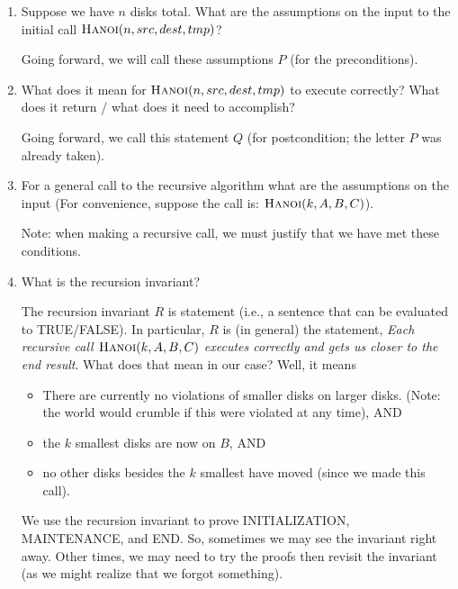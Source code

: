 \documentclass{article}
\begin{document}
\begin{enumerate}
    \item Suppose we have $n$ disks total. What are the assumptions on the input
        to the initial call $\textsc{Hanoi}(n,src,dest,tmp)$?

        \answer

        Going forward, we will call these assumptions $P$ (for the
        preconditions).

    \pagebreak
    \item What does it mean for $\textsc{Hanoi}(n,src,dest,tmp)$ to execute
        correctly? What does it return / what does it need to accomplish?

        \answer

        Going forward, we call this statement $Q$ (for postcondition; the letter
        $P$ was already taken).

    \item For a general call to the recursive algorithm what are the assumptions on the input
        (For convenience, suppose the call is: $\textsc{Hanoi}(k,A,B,C)$).

        \answer

        Note: when making a recursive call, we must justify that we have met
        these conditions.

    \item What is the recursion invariant?

        The recursion invariant $R$ is statement (i.e., a sentence that can be
        evaluated to TRUE/FALSE).
        In particular, $R$ is (in general) the statement,
        \emph{Each recursive call $\textsc{Hanoi}(k,A,B,C)$ executes
        correctly and gets us closer to the end result}.
        What does that mean in our case?  Well, it means
        \begin{itemize}
            \item There are currently no violations of smaller disks on larger
                disks. (Note: the world would crumble if this were violated at
                any time), AND
            \item the $k$ smallest disks are now on $B$, AND
            \item no other disks besides the $k$ smallest have moved (since
                we made this call).
        \end{itemize}

        We use the recursion invariant to prove INITIALIZATION, MAINTENANCE, and
        END.  So, sometimes we may see the invariant right away.  Other times,
        we may need to try the proofs then revisit the invariant (as we might
        realize that we forgot something).


\end{enumerate}
\end{document}
